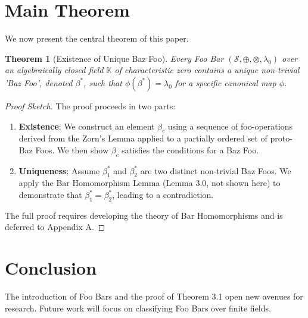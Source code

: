 \documentclass{article}
\newtheorem{theorem}{Theorem}[section]
\begin{document}
\section{Main Theorem}

We now present the central theorem of this paper.

\begin{theorem}[Existence of Unique Baz Foo]
\label{thm:maintheorem}
Every Foo Bar $(\mathcal{S}, \oplus, \otimes, \lambda_0)$ over an algebraically closed field $\mathbb{K}$ of characteristic zero contains a unique non-trivial 'Baz Foo', denoted $\beta^*$, such that $\phi(\beta^*) = \lambda_0$ for a specific canonical map $\phi$.
\end{theorem}

\begin{proof}[Proof Sketch]
The proof proceeds in two parts:
\begin{enumerate}
    \item \textbf{Existence}: We construct an element $\beta_c$ using a sequence of foo-operations derived from the Zorn's Lemma applied to a partially ordered set of proto-Baz Foos. We then show $\beta_c$ satisfies the conditions for a Baz Foo.
    \item \textbf{Uniqueness}: Assume $\beta_1^*$ and $\beta_2^*$ are two distinct non-trivial Baz Foos. We apply the Bar Homomorphism Lemma (Lemma 3.0, not shown here) to demonstrate that $\beta_1^* = \beta_2^*$, leading to a contradiction.
\end{enumerate}
The full proof requires developing the theory of Bar Homomorphisms and is deferred to Appendix A.
\end{proof}

\section{Conclusion}

The introduction of Foo Bars and the proof of Theorem 3.1 open new avenues for research. Future work will focus on classifying Foo Bars over finite fields.
\end{document}
